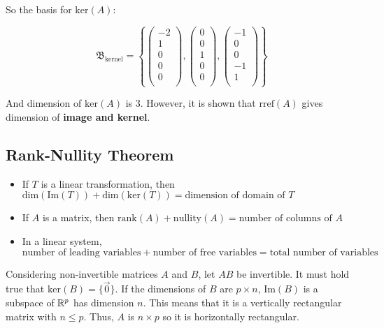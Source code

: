 So the basis for $\mathrm{ker}(A)$:

\[\mathfrak{B}_\mathrm{kernel}=\left\{\begin{pmatrix}-2\\1\\0\\0\\0\\ \end{pmatrix}, \begin{pmatrix} 0\\0\\1\\0\\0\\ \end{pmatrix}, \begin{pmatrix}-1\\0\\0\\-1\\1\\ \end{pmatrix} \right\}\]

And dimension of $\mathrm{ker}(A)$ is 3.
However, it is shown that $\mathrm{rref}(A)$ gives dimension of \textbf{image and kernel}.

\subsection{Rank-Nullity Theorem}

\begin{framed}
    \begin{itemize}
        \item If $T$ is a linear transformation, 
        then \\$\mathrm{dim}(\mathrm{Im}(T))+\mathrm{dim}(\mathrm{ker}(T))=\text{dimension of domain of }T$
        \item If $A$ is a matrix, then $\mathrm{rank}(A)+\mathrm{nullity}(A)=\text{number of columns of }A$
        \item In a linear system, 
        \\$\text{number of leading variables}+\text{number of free variables}=\text{total number of variables}$
    \end{itemize}
\end{framed}

Considering non-invertible matrices $A$ and $B$, let $AB$ be invertible.
It must hold true that $\mathrm{ker}(B)=\{\vec{0}\}$. If the dimensions of $B$ are $p\times n$,
$\mathrm{Im}(B)$ is a subspace of $\mathbb{R}^p$ has dimension $n$. This means that it is a vertically rectangular
matrix with $n\leq p$. Thus, $A$ is $n\times p$ so it is horizontally rectangular.